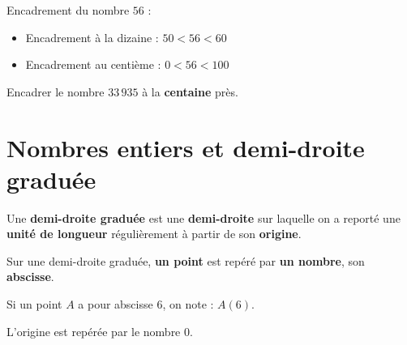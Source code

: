 \documentclass[a4paper,dvipsnames]{article}
\begin{document}
\begin{Ex}
Encadrement du nombre $56$ :
 \begin{itemize}
\item Encadrement à la dizaine : \(50 < 56< 60\)

\item Encadrement au centième : \(0 < 56< 100\)
 \end{itemize}
\end{Ex}

\begin{ExOApp}[]
Encadrer le nombre $33\,935$ à la \textbf{centaine} près.
\end{ExOApp}

\section{Nombres entiers et demi-droite graduée}

\begin{Def}
Une \textbf{demi-droite graduée} est une \textbf{demi-droite} sur laquelle on a reporté une \textbf{unité de longueur} régulièrement à partir de son \textbf{origine}.

Sur une demi-droite graduée, \textbf{un point} est repéré par \textbf{un nombre}, son \textbf{abscisse}.

Si un point $A$ a pour abscisse $6$, on note : $A(6)$.

L'origine est repérée par le nombre $0$.

\begin{center}
\end{center}

\end{Def}
\end{document}

